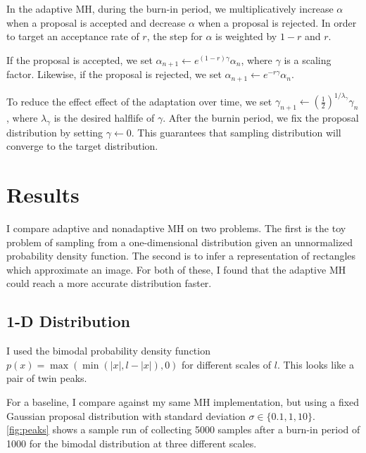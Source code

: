 \documentclass{article}
\begin{document}
In the adaptive MH, during the burn-in period, we multiplicatively increase $\alpha$ when a proposal is accepted and decrease $\alpha$ when a proposal is rejected. In order to target an acceptance rate of $r$, the step for $\alpha$ is weighted by $1-r$ and $r$.

If the proposal is accepted, we set $\alpha_{n+1}\leftarrow e^{(1-r)\gamma}\alpha_n$, where $\gamma$ is a scaling factor. Likewise, if the proposal is rejected, we set $\alpha_{n+1}\leftarrow e^{-r\gamma}\alpha_n$.

To reduce the effect effect of the adaptation over time, we set $\gamma_{n+1}\leftarrow \left(\frac12\right)^{1/\lambda_\gamma}\gamma_n$, where $\lambda_\gamma$ is the desired halflife of $\gamma$. After the burnin period, we fix the proposal distribution by setting $\gamma\leftarrow0$. This guarantees that sampling distribution will converge to the target distribution.

\section{Results}

I compare adaptive and nonadaptive MH on two problems. The first is the toy problem of sampling from a one-dimensional distribution given an unnormalized probability density function. The second is to infer a representation of rectangles which approximate an image. For both of these, I found that the adaptive MH could reach a more accurate distribution faster.

\subsection{1-D Distribution}
I used the bimodal probability density function $p(x)=\max(\min(|x|,l-|x|),0)$ for different scales of $l$. This looks like a pair of twin peaks.

For a baseline, I compare against my same MH implementation, but using a fixed Gaussian proposal distribution with standard deviation $\sigma\in\{0.1,1,10\}$. \cref{fig:peaks} shows a sample run of collecting 5000 samples after a burn-in period of 1000 for the bimodal distribution at three different scales.
\end{document}
